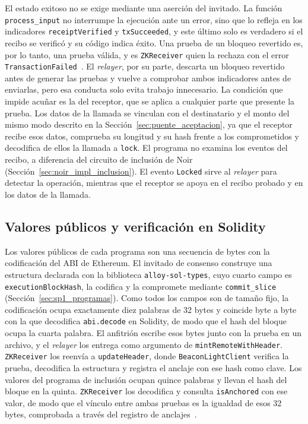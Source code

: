 El estado exitoso no se exige mediante una aserción del invitado. La función
\texttt{process\_input} no interrumpe la ejecución ante un error, sino que lo refleja en los
indicadores \texttt{receiptVerified} y \texttt{txSucceeded}, y este último solo es verdadero si el
recibo se verificó y su código indica éxito. Una prueba de un bloqueo revertido es, por lo tanto,
una prueba válida, y es \texttt{ZKReceiver} quien la rechaza con el error
\texttt{TransactionFailed}~\cite{zkguaranibridgesp1}. El \textit{relayer}, por su parte, descarta un
bloqueo revertido antes de generar las pruebas y vuelve a comprobar ambos indicadores antes de
enviarlas, pero esa conducta solo evita trabajo innecesario. La condición que impide acuñar es la
del receptor, que se aplica a cualquier parte que presente la prueba. Los datos de la llamada se
vinculan con el destinatario y el monto del mismo modo descrito en la
Sección~\ref{sec:puente_aceptacion}, ya que el receptor recibe esos datos, comprueba su longitud y
su hash frente a los comprometidos y decodifica de ellos la llamada a \texttt{lock}. El programa
no examina los eventos del recibo, a diferencia del circuito de inclusión de Noir
(Sección~\ref{sec:noir_impl_inclusion}). El evento \texttt{Locked} sirve al \textit{relayer} para
detectar la operación, mientras que el receptor se apoya en el recibo probado y en los datos de la
llamada.

\subsection{Valores públicos y verificación en Solidity}
\label{sec:sp1_impl_publicas}

Los valores públicos de cada programa son una secuencia de bytes con la codificación del ABI de
Ethereum. El invitado de consenso construye una estructura declarada con la biblioteca
\texttt{alloy-sol-types}, cuyo cuarto campo es \texttt{executionBlockHash}, la codifica y la
compromete mediante \lstinline|commit_slice| (Sección~\ref{sec:sp1_programas}). Como todos los
campos son de tamaño fijo, la codificación ocupa exactamente diez palabras de 32 bytes y coincide
byte a byte con la que decodifica \lstinline|abi.decode| en Solidity, de modo que el hash del bloque
ocupa la cuarta palabra. El anfitrión escribe esos bytes junto con la prueba en un archivo, y el
\textit{relayer} los entrega como argumento de \lstinline|mintRemoteWithHeader|.
\texttt{ZKReceiver} los reenvía a \lstinline|updateHeader|, donde \texttt{BeaconLightClient}
verifica la prueba, decodifica la estructura y registra el anclaje con ese hash como clave. Los
valores del programa de inclusión ocupan quince palabras y llevan el hash del bloque en la quinta.
\texttt{ZKReceiver} los decodifica y consulta \lstinline|isAnchored| con ese valor, de modo que el
vínculo entre ambas pruebas es la igualdad de esos 32 bytes, comprobada a través del registro de
anclajes~\cite{zkguaranibridgesp1, sp1synccommitteerepo, txinclusionsp1repo}.

